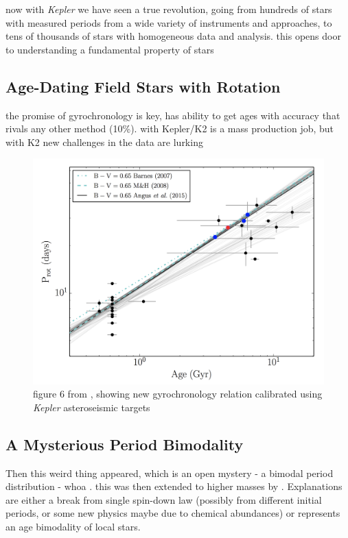 \documentclass[12pt]{article}
\newcommand{\Kepler}{\textsl{Kepler}\xspace}
\begin{document}
now with \Kepler we have seen a true revolution, going from hundreds of stars with measured periods from a wide variety of instruments and approaches, to tens of thousands of stars with homogeneous data and analysis. this opens door to understanding a fundamental property of stars 


\subsection{Age-Dating Field Stars with Rotation}

\citet{skumanich1972}
\citet{barnes2007}
the promise of gyrochronology is key, has ability to get ages with accuracy that rivals any other method (10\%). with Kepler/K2 is a mass production job, but with K2 new challenges in the data are lurking

\begin{figure}[!th]
\centering
\includegraphics[width=4.5in]{angus2015_fig6.png}
\caption{figure 6 from \citet{angus2015}, showing new gyrochronology relation calibrated using \Kepler asteroseismic targets
}
\label{fig:gyro}
\end{figure}



\subsection{A Mysterious Period Bimodality}

Then this weird thing appeared, which is an open mystery - a bimodal period distribution - whoa \citep{mcquillan2013}. this was then extended to higher masses by \citet{davenport2017}. Explanations are either a break from single spin-down law (possibly from different initial periods, or some new physics maybe due to chemical abundances) or represents an age bimodality of local stars.
\end{document}
